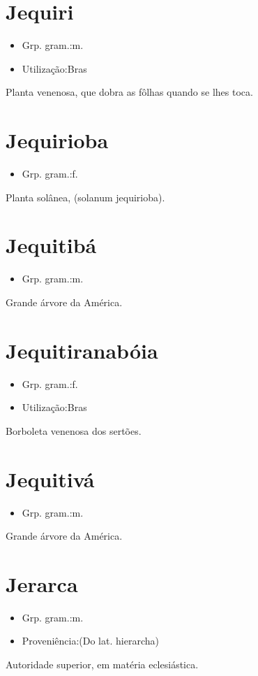 \documentclass{article}
\begin{document}
\section{Jequiri}
\begin{itemize}
\item {Grp. gram.:m.}
\end{itemize}
\begin{itemize}
\item {Utilização:Bras}
\end{itemize}
Planta venenosa, que dobra as fôlhas quando se lhes toca.
\section{Jequirioba}
\begin{itemize}
\item {Grp. gram.:f.}
\end{itemize}
Planta solânea, (\textunderscore solanum jequirioba\textunderscore ).
\section{Jequitibá}
\begin{itemize}
\item {Grp. gram.:m.}
\end{itemize}
Grande árvore da América.
\section{Jequitiranabóia}
\begin{itemize}
\item {Grp. gram.:f.}
\end{itemize}
\begin{itemize}
\item {Utilização:Bras}
\end{itemize}
Borboleta venenosa dos sertões.
\section{Jequitivá}
\begin{itemize}
\item {Grp. gram.:m.}
\end{itemize}
Grande árvore da América.
\section{Jerarca}
\begin{itemize}
\item {Grp. gram.:m.}
\end{itemize}
\begin{itemize}
\item {Proveniência:(Do lat. \textunderscore hierarcha\textunderscore )}
\end{itemize}
Autoridade superior, em matéria eclesiástica.
\end{document}

